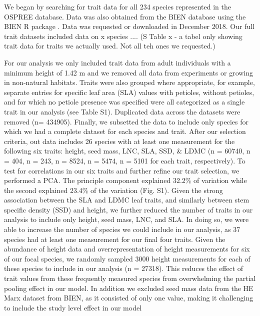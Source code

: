 \documentclass{article}\usepackage[]{graphicx}\usepackage[]{color}
\begin{document}

We began by searching for trait data for all 234 species represented in the OSPREE database. Data was also obtained from the BIEN database using the BIEN R package \citep{Maitner2017}. Data was requested or downloaded in December 2018. Our full trait datasets included data on x species .... (S Table x - a tabel only showing trait data for traits we actually used. Not all teh ones we requested.) 

For our analysis we only included trait data from adult individuals with a minimum height of 1.42 m and we removed all data from experiments or growing in non-natural habitats. Traits were also grouped where appropriate, for example, separate entries for specific leaf area (SLA) values with petioles, without petioles, and for which no petiole presence was specified were all categorized as a single trait in our analysis (see Table S1). Duplicated data across the datasets were removed (n= 434905). Finally, we subsetted the data to include only species for which we had a complete dataset for each species and trait. After our selection criteria, out data includes 26 species with at least one measurement for the following six traits: height, seed mass, LNC, SLA, SSD, \& LDMC (n = 60740, n = 404, n = 243, n = 8524, n = 5474, n = 5101 for each trait, respectively). To test for correlations in our six traits and further refine our trait selection, we performed a PCA. The principle component explained 32.2\% of variation while the second explained 23.4\% of the variation (Fig. S1). Given the strong association between the SLA and LDMC leaf traits, and similarly between stem specific density (SSD) and height, we further reduced the number of traits in our analysis to include only height, seed mass, LNC, and SLA. In doing so, we were able to increase the number of species we could include in our analysis, as 37 species had at least one measurement for our final four traits. Given the abundance of height data and overrepresentation of height measurements for six of our focal species, we randomly sampled 3000 height measurements for each of these species to include in our analysis (n = 27318). This reduces the effect of trait values from these frequently measured species from overwhelming the partial pooling effect in our model. In addition we excluded seed mass data from the HE Marx dataset from BIEN, as it consisted of only one value, making it challenging to include the study level effect in our model\\ 
\end{document}
